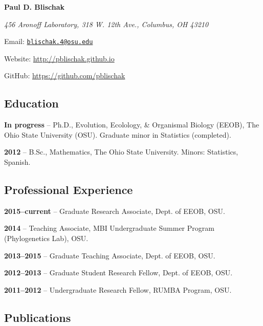 \documentclass[]{article}
\title{}
\author{}
\date{}
\begin{document}

\textbf{\LARGE Paul D. Blischak}
\vspace{0.1in}

\emph{456 Aronoff Laboratory, 318 W. 12th Ave., Columbus, OH 43210}

Email: \href{mailto:blischak.4@osu.edu}{\nolinkurl{blischak.4@osu.edu}}

Website:
\href{http://pblischak.github.io}{\url{http://pblischak.github.io}}

GitHub:
\href{https://github.com/pblischak}{\url{https://github.com/pblischak}}

\subsection{\texorpdfstring{\textbf{Education}}{Education}}\label{education}

\textbf{In progress} -- Ph.D., Evolution, Ecolology, \& Organismal Biology (EEOB), The
Ohio State University (OSU). Graduate minor in Statistics (completed).

\textbf{2012} -- B.Sc., Mathematics, The Ohio State University. Minors:
Statistics, Spanish.

\subsection{\texorpdfstring{\textbf{Professional
Experience}}{Professional Experience}}\label{professional-experience}

\textbf{2015--current} -- Graduate Research Associate, Dept. of EEOB,
OSU.

\textbf{2014} -- Teaching Associate, MBI Undergraduate Summer Program
(Phylogenetics Lab), OSU.

\textbf{2013--2015} -- Graduate Teaching Associate, Dept. of EEOB, OSU.

\textbf{2012--2013} -- Graduate Student Research Fellow, Dept. of EEOB, OSU.

\textbf{2011--2012} -- Undergraduate Research Fellow, RUMBA Program,
OSU.

\subsection{\texorpdfstring{\textbf{Publications}}{Publications}}\label{publications}
\end{document}
